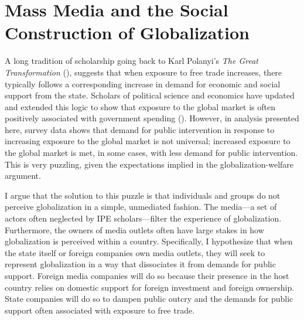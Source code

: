 \documentclass[12pt]{report}
\begin{document}

\chapter{Mass Media and the Social Construction of Globalization}

A long tradition of scholarship going back to Karl Polanyi's \emph{The Great Transformation} (\citeyear{Polanyi:2001vc}), suggests that when exposure to free trade increases, there typically follows a corresponding increase in demand for economic and social support from the state. Scholars of political science and economics have updated and extended this logic to show that exposure to the global market is often positively associated with government spending (\citealt{Adsera:2002vt, Cameron:1978vb, Garrett:1998wl,Rodrik:1998te}). However, in analysis presented here, survey data shows that demand for public intervention in response to increasing exposure to the global market is not universal; increased exposure to the global market is met, in some cases, with less demand for public intervention. This is very puzzling, given the expectations implied in the globalization-welfare argument.

	I argue that the solution to this puzzle is that individuals and groups do not perceive globalization in a simple, unmediated fashion. The media---a set of actors often neglected by IPE scholars---filter the experience of globalization. Furthermore, the owners of media outlets often have large stakes in how globalization is perceived within a country. Specifically, I hypothesize that when the state itself or foreign companies own media outlets, they will seek to represent globalization in a way that dissociates it from demands for public support. Foreign media companies will do so because their presence in the host country relies on domestic support for foreign investment and foreign ownership. State companies will do so to dampen public outcry and the demands for public support often associated with exposure to free trade.
\end{document}
